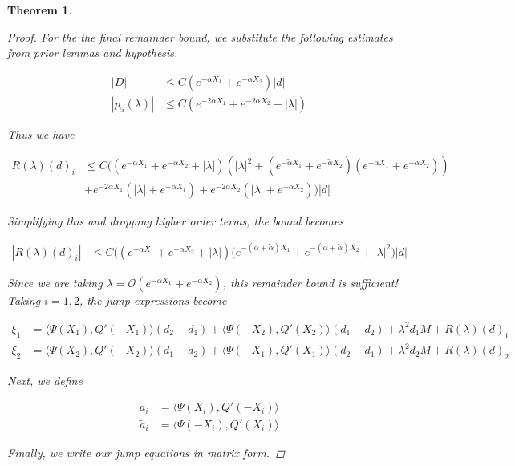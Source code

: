 \documentclass[12pt]{article}
\newtheorem{theorem}{Theorem}
\begin{document}
\begin{theorem}
\begin{proof}
For the the final remainder bound, we substitute the following estimates from prior lemmas and hypothesis.

\begin{align*}
|D| &\leq C (e^{-\alpha X_1} + e^{-\alpha X_2}) |d| \\
|p_5(\lambda)| &\leq C( e^{-2 \alpha X_1} + e^{-2 \alpha X_2} + |\lambda|)
\end{align*}

Thus we have

\begin{align*}
R(\lambda)(d)_i &\leq C \Big( ( e^{-\alpha X_1} + e^{-\alpha X_2} + |\lambda|  )(|\lambda|^2 + (e^{-\tilde{\alpha}X_1} + e^{-\tilde{\alpha}X_2}) (e^{-\alpha X_1} + e^{-\alpha X_2})) \\
&+ e^{-2 \alpha X_1}(|\lambda| + e^{-\alpha X_1}) 
+ e^{-2 \alpha X_2}(|\lambda| + e^{-\alpha X_2}) \Big) |d|
\end{align*}

Simplifying this and dropping higher order terms, the bound becomes

\begin{align*}
|R(\lambda)(d)_i| &\leq C \Big( (e^{-\alpha X_1} + e^{-\alpha X_2} + |\lambda| )(e^{-(\alpha + \tilde{\alpha})X_1} + e^{-(\alpha + \tilde{\alpha})X_2} 
+ |\lambda|^2 \Big) |d|
\end{align*}

Since we are taking $\lambda = \mathcal{O}(e^{-\alpha X_1} + e^{-\alpha X_2})$, this remainder bound is sufficient!\\

Taking $i = 1, 2$, the jump expressions become

\begin{align*}
\xi_1 &= \langle \Psi(X_1), Q'(-X_1) \rangle (d_2 - d_1 ) + \langle \Psi(-X_2), Q'(X_2) \rangle (d_1 - d_2 ) + \lambda^2 d_1 M + R(\lambda)(d)_1 \\
\xi_2 &= \langle \Psi(X_2), Q'(-X_2) \rangle (d_1 - d_2 ) + \langle \Psi(-X_1), Q'(X_1) \rangle (d_2 - d_1 ) + \lambda^2 d_2 M + R(\lambda)(d)_2
\end{align*}

Next, we define

\begin{align*}
a_i &= \langle \Psi (X_i), Q'(-X_i) \rangle \\
\tilde{a}_i &= \langle \Psi(-X_i), Q'(X_i) \rangle
\end{align*}

Finally, we write our jump equations in matrix form.


\end{proof}
\end{theorem}
\end{document}
